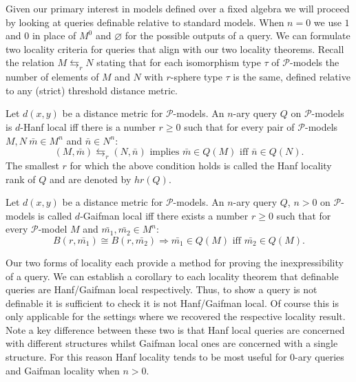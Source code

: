 \documentclass{lmcs} %
\newcommand{\?}{\ensuremath{\mkern0.4\thinmuskip}}
\let\isom=\cong%
\newcommand{\CP}{\mathcal{P}}
\begin{document}
Given our primary interest in models defined over a fixed algebra we will proceed by looking at queries definable relative to standard models. When $n=0$ we use $1$ and $0$ in place of $M^0$ and $\varnothing$ for the possible outputs of a query. We can formulate two locality criteria for queries that align with our two locality theorems. Recall the relation $M\leftrightarrows_r N$ stating that for each isomorphism type $\tau$ of $\CP$-models the number of elements of $M$ and $N$ with $r$-sphere type $\tau$ is the same, defined relative to any (strict) threshold distance metric. 
\begin{defi}
    Let $d(x,y)$ be a distance metric for $\CP$-models. An $n$-ary query $Q$ on $\CP$-models is $d$-Hanf local iff there is a number $r\geq 0$ such that for every pair of $\CP$-models $M,N\ \bar{m}\in M^n$ and $\bar{n}\in N^n$: \[(M,\bar{m})\leftrightarrows_{r} (N,\bar{n}) \text{ implies }\bar{m}\in Q(M)\text{ iff }\bar{n}\in Q(N).\]
    The smallest $r$ for which the above condition holds is called the Hanf locality rank of $Q$ and are denoted by $hr(Q)$.
\end{defi}

\begin{defi}
    Let $d(x,y)$ be a distance metric for $\CP$-models. An $n$-ary query $Q$, $n>0$ on $\CP$-models is called $d$-Gaifman local iff there exists a number $r\geq 0$ such that for every $\CP$-model $M$ and $\bar{m_1},\bar{m_2}\in M^n$: \[B(r,\bar{m_1})\isom B(r,\bar{m_2})\Rightarrow \bar{m_1}\in Q(M)\text{ iff }\bar{m_2}\in Q(M).\]
\end{defi}
Our two forms of locality each provide a method for proving the inexpressibility of a query. We can establish a corollary to each locality theorem that definable queries are Hanf/Gaifman local respectively. Thus, to show a query is not definable it is sufficient to check it is not Hanf/Gaifman local. Of course this is only applicable for the settings where we recovered the respective locality result. Note a key difference between these two is that Hanf local queries are concerned with different structures whilst Gaifman local ones are concerned with a single structure. For this reason Hanf locality tends to be most useful for $0$-ary queries and Gaifman locality when $n>0$. 
\end{document}
